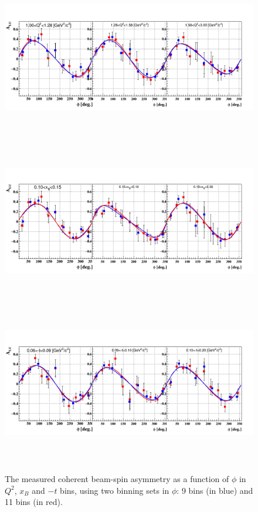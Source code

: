 \begin{figure}[tbp]
   \centering
      \includegraphics[height=7.2cm]{fig/sBSA_Coherent_Q2.png}
      \includegraphics[height=7.2cm]{fig/sBSA_Coherent_xB.png}
      \includegraphics[height=7.2cm]{fig/sBSA_Coherent_t.png}
     \caption{The measured coherent beam-spin asymmetry as
     a function of $\phi$ in $Q^{2}$, $x_B$ and $-t$ bins, using two binning 
  sets in $\phi$: 9 bins (in blue) and 11 bins (in red).}
      \label{fig:coh_bins_phi_9_11}
    \end{figure}

